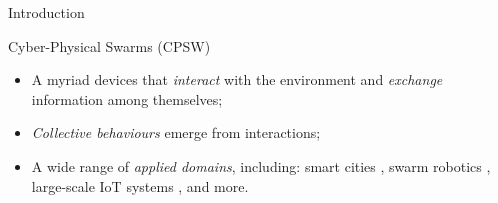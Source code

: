 \documentclass[presentation]{beamer}\mode<presentation>{\usetheme{AMSBolognaFC}}
\begin{document}
\begin{frame}[allowframebreaks]{Introduction}

\begin{block}{Cyber-Physical Swarms (CPSW)}
	\begin{itemize}
		\item A myriad devices that \emph{interact} with the environment and \emph{exchange} information 
			among themselves;
		\item \emph{Collective behaviours} emerge from interactions;
		\item A wide range of \emph{applied domains}, including: smart cities \cite{zedadra2019swarm}, 
			swarm robotics \cite{brambilla2013swarm}, 
			large-scale IoT systems \cite{uslu2023role}, and more.
	\end{itemize}
\end{block}


\end{frame}
\end{document}
